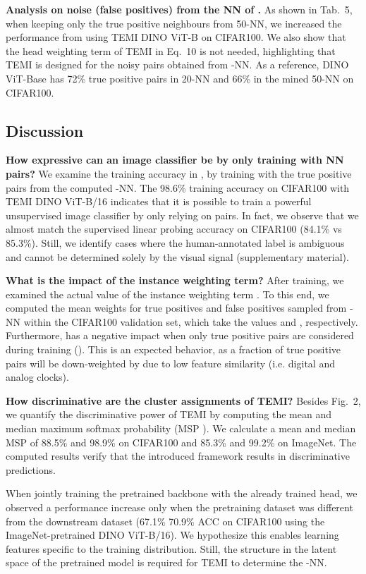 \documentclass{bmvc2k}
\begin{document}
\textbf{Analysis on noise (false positives) from the NN of .} As shown in Tab.\ 5, when keeping only the true positive neighbours from 50-NN, we increased the performance from    using TEMI DINO ViT-B on CIFAR100. We also show that the head weighting term of TEMI in Eq.\ 10 is not needed, highlighting that TEMI is designed for the noisy pairs obtained from -NN. As a reference, DINO ViT-Base has 72\% true positive pairs in 20-NN and 66\% in the mined 50-NN on CIFAR100.


\subsection{Discussion}
\label{discussion}
\noindent\textbf{How expressive can an image classifier be by only training with NN pairs?} We examine the training accuracy in , by training with the true positive pairs from the computed -NN. The 98.6\% training accuracy on CIFAR100 with TEMI DINO ViT-B/16 indicates that it is possible to train a powerful unsupervised image classifier by only relying on pairs. In fact, we observe that we almost match the supervised linear probing accuracy on CIFAR100 (84.1\% vs 85.3\%). Still, we identify cases where the human-annotated label is ambiguous and cannot be determined solely by the visual signal (supplementary material).

\noindent\textbf{What is the impact of the instance weighting term?} 
After training, we examined the actual value of the instance weighting term . To this end, we computed the mean weights for true positives and false positives sampled from -NN within the CIFAR100 validation set, which take the values  and , respectively. Furthermore,  has a negative impact when only true positive pairs are considered during training (). This is an expected behavior, as a fraction of true positive pairs will be down-weighted by  due to low feature similarity (i.e. digital and analog clocks).

\noindent\textbf{How discriminative are the cluster assignments of TEMI?}
Besides Fig.\ 2, we quantify the discriminative power of TEMI by computing the mean and median maximum softmax probability (MSP \cite{hendrycks2016msp}). We calculate a mean and median MSP of 88.5\% and 98.9\% on CIFAR100 and 85.3\% and 99.2\% on ImageNet. The computed results verify that the introduced framework results in discriminative predictions.


 When jointly training the pretrained backbone with the already trained head, we observed a performance increase only when the pretraining dataset was different from the downstream dataset (67.1\%  70.9\% ACC on CIFAR100 using the ImageNet-pretrained DINO ViT-B/16). We hypothesize this enables learning features specific to the training distribution. Still, the structure in the latent space of the pretrained model is required for TEMI to determine the -NN.
\end{document}
